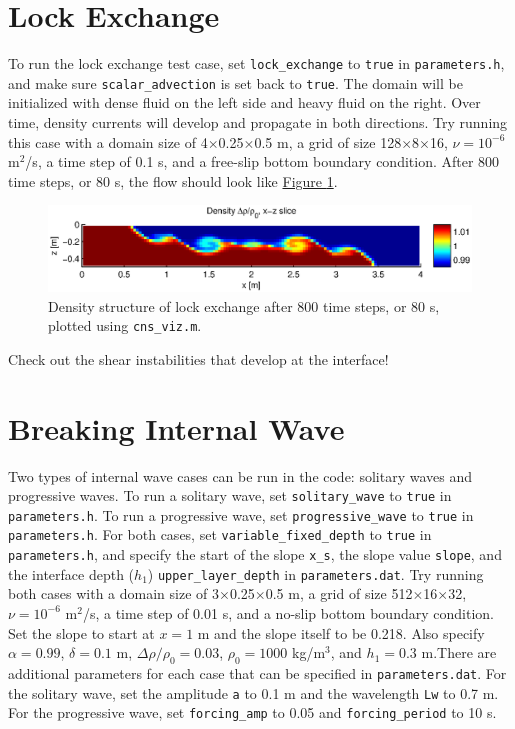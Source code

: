 \documentclass[12pt]{report}
\begin{document}
\section{Lock Exchange}
To run the lock exchange test case, set \texttt{lock\_exchange} to \texttt{true} in \texttt{parameters.h}, and make sure \texttt{scalar\_advection} is set back to \texttt{true}. The domain will be initialized with dense fluid on the left side and heavy fluid on the right. Over time, density currents will develop and propagate in both directions. Try running this case with a domain size of 4$\times$0.25$\times$0.5 m, a grid of size 128$\times$8$\times$16, $\nu=10^{-6}$ m$^2$/s, a time step of 0.1 s, and a free-slip bottom boundary condition. After 800 time steps, or 80 s, the flow should look like \hyperref[fig:lock]{Figure \ref*{fig:lock}}. 
\begin{figure}
\centering
\includegraphics[scale=0.9]{lock}
\caption{Density structure of lock exchange after 800 time steps, or 80 s, plotted using \texttt{cns\_viz.m}.}
\label{fig:lock}
\end{figure}
Check out the shear instabilities that develop at the interface!

\section{Breaking Internal Wave}
Two types of internal wave cases can be run in the code: solitary waves and progressive waves. To run a solitary wave, set \texttt{solitary\_wave} to \texttt{true} in \texttt{parameters.h}. To run a progressive wave, set \texttt{progressive\_wave} to \texttt{true} in \texttt{parameters.h}. For both cases, set \texttt{variable\_fixed\_depth} to \texttt{true} in \texttt{parameters.h}, and specify the start of the slope \texttt{x\_s}, the slope value \texttt{slope}, and the interface depth ($h_1$) \texttt{upper\_layer\_depth} in \texttt{parameters.dat}. Try running both cases with a domain size of 3$\times$0.25$\times$0.5 m, a grid of size 512$\times$16$\times$32, $\nu=10^{-6}$ m$^2$/s, a time step of 0.01 s, and a no-slip bottom boundary condition. Set the slope to start at $x=1$ m and the slope itself to be 0.218. Also specify $\alpha=0.99$, $\delta=0.1$ m, $\Delta\rho/\rho_0=0.03$, $\rho_0=1000$ kg/m$^3$, and $h_1=0.3$ m.There are additional parameters for each case that can be specified in \texttt{parameters.dat}. For the solitary wave, set the amplitude \texttt{a} to 0.1 m and the wavelength \texttt{Lw} to 0.7 m. For the progressive wave, set \texttt{forcing\_amp} to 0.05 and \texttt{forcing\_period} to 10 s. 
\end{document}
